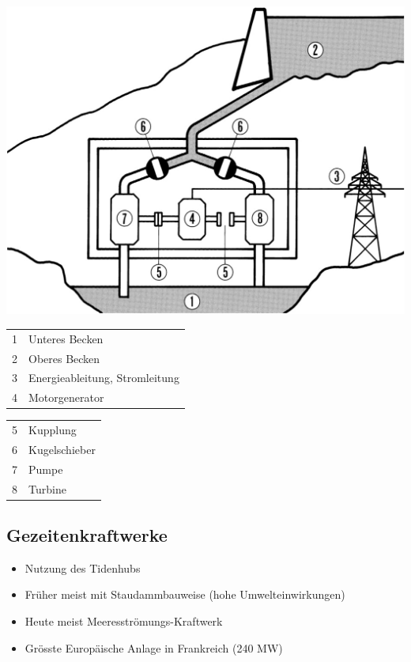 \begin{center}
    \includegraphics[width=0.95\columnwidth, align=c]{images/Pumpspeicherkraftwerke.png}
\end{center}

\begin{minipage}[t]{0.48\columnwidth}
    \begin{tabular}{c l}
        1 & Unteres Becken \\
        2 & Oberes Becken \\
        3 & Energieableitung, Stromleitung \\
        4 & Motorgenerator \\
    \end{tabular}
\end{minipage}
\hfill
\begin{minipage}[t]{0.48\columnwidth}
    \begin{tabular}{c l}
        5 & Kupplung \\
        6 & Kugelschieber \\
        7 & Pumpe \\
        8 & Turbine \\
    \end{tabular}
\end{minipage}


\subsection{Gezeitenkraftwerke}

\begin{itemize}
    \item Nutzung des Tidenhubs
    \item Früher meist mit Staudammbauweise (hohe Umwelteinwirkungen)
    \item Heute meist Meeresströmungs-Kraftwerk
    \item Grösste Europäische Anlage in Frankreich (240 MW)
\end{itemize}


